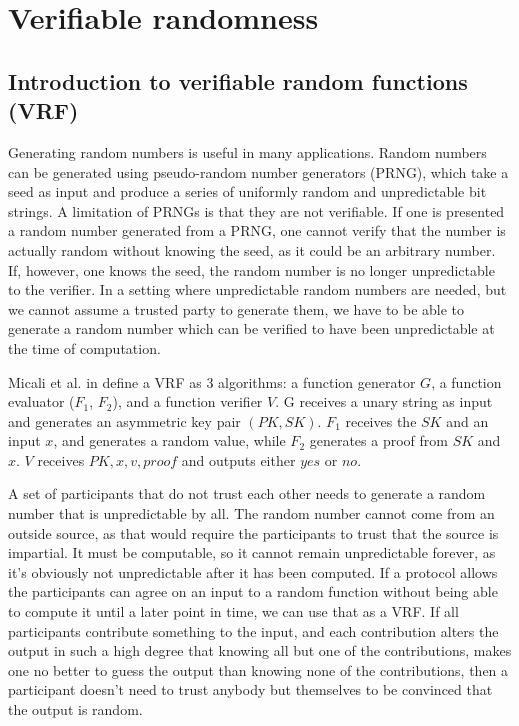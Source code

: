 \section{Verifiable randomness}
\label{sec:vrf}

\subsection{Introduction to verifiable random functions (VRF)}

Generating random numbers is useful in many applications. Random numbers can be generated using pseudo-random number generators (PRNG), which take a seed as input and produce a series of uniformly random and unpredictable bit strings. A limitation of PRNGs is that they are not verifiable. If one is presented a random number generated from a PRNG, one cannot verify that the number is actually random without knowing the seed, as it could be an arbitrary number. If, however, one knows the seed, the random number is no longer unpredictable to the verifier. In a setting where unpredictable random numbers are needed, but we cannot assume a trusted party to generate them, we have to be able to generate a random number which can be verified to have been unpredictable at the time of computation.

Micali et al. in \cite{micali_verifiable_1999} define a VRF as 3 algorithms: a function generator $G$, a function evaluator ($F_1$, $F_2$), and a function verifier $V$. G receives a unary string as input and generates an asymmetric key pair $(PK, SK)$. $F_1$ receives the $SK$ and an input $x$, and generates a random value, while $F_2$ generates a proof from $SK$ and $x$. $V$ receives $PK, x, v, proof$ and outputs either $yes$ or $no$.

A set of participants that do not trust each other needs to generate a random number that is unpredictable by all. The random number cannot come from an outside source, as that would require the participants to trust that the source is impartial.  It must be computable, so it cannot remain unpredictable forever, as it's obviously not unpredictable after it has been computed. If a protocol allows the participants can agree on an input to a random function without being able to compute it until a later point in time, we can use that as a VRF. If all participants contribute something to the input, and each contribution alters the output in such a high degree that knowing all but one of the contributions, makes one no better to guess the output than knowing none of the contributions, then a participant doesn't need to trust anybody but themselves to be convinced that the output is random.

